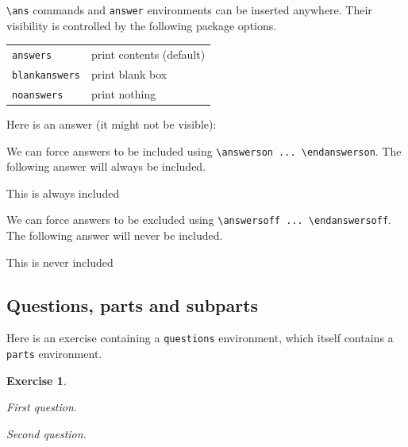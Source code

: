 \documentclass{article}
\theoremstyle{break}
\newcounter{theorem}
\newtheorem{exercise}[theorem]{Exercise}
\begin{document}
\verb+\ans+ commands and {\tt answer} environments can be inserted anywhere. Their visibility is controlled by the following package options.

\bigskip
\begin{tabular}{ll}
\hline
{\tt answers}		& print contents (default) \\
{\tt blankanswers}	& print  blank box \\
{\tt noanswers}		& print nothing \\
\hline
\end{tabular}
\bigskip

Here is an answer (it might not be visible):
\begin{answer}
\lipsum[1]
\end{answer}

We can force answers to be included using \verb+\answerson ... \endanswerson+. The following answer will always be included.
\answerson
\begin{answer}
This is always included
\end{answer}
\endanswerson

We can force answers to be excluded using  \verb+\answersoff ... \endanswersoff+. The following answer will never be included.
\answersoff
\begin{answer}
This is never included
\end{answer}
\endanswersoff

\subsection{Questions, parts and subparts}

Here is an exercise containing a {\tt questions} environment, which itself contains a {\tt parts} environment. 
\begin{exercise}\label{exe:demo}
\begin{questions}
\question First question.
\question Second question.
\end{questions}
\end{exercise}
\end{document}
